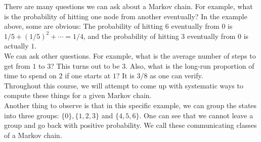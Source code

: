 There are many questions we can ask about a Markov chain.
For example, what is the probability of hitting one node from another eventually?
In the example above, some are obvious:
The probability of hitting $6$ eventually from $0$ is $1/5+(1/5)^2+\cdots=1/4$, and the probability of hitting $3$ eventually from $0$ is actually $1$.\\
We can ask other questions.
For example, what is the average number of steps to get from $1$ to $3$?
This turns out to be $3$.
Also, what is the long-run proportion of time to spend on $2$ if one starts at $1$?
It is $3/8$ as one can verify.\\
Throughout this course, we will attempt to come up with systematic ways to compute these things for a given Markov chain.\\
Another thing to observe is that in this specific example, we can group the states into three groups: $\{0\},\{1,2,3\}$ and $\{4,5,6\}$.
One can see that we cannot leave a group and go back with positive probability.
We call these communicating classes of a Markov chain.
